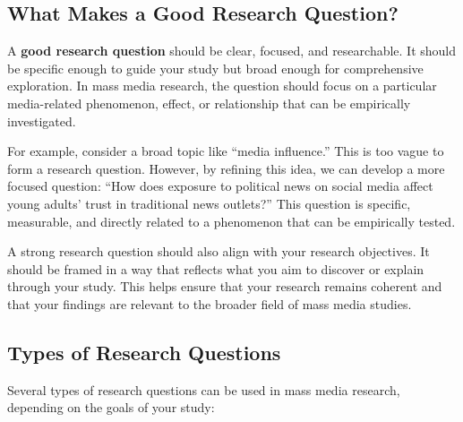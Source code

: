 \documentclass[
]{book}
\begin{document}
\subsection*{What Makes a Good Research Question?}\label{what-makes-a-good-research-question}

A \textbf{good research question} should be clear, focused, and researchable. It should be specific enough to guide your study but broad enough for comprehensive exploration. In mass media research, the question should focus on a particular media-related phenomenon, effect, or relationship that can be empirically investigated.

For example, consider a broad topic like ``media influence.'' This is too vague to form a research question. However, by refining this idea, we can develop a more focused question: ``How does exposure to political news on social media affect young adults' trust in traditional news outlets?'' This question is specific, measurable, and directly related to a phenomenon that can be empirically tested.

A strong research question should also align with your research objectives. It should be framed in a way that reflects what you aim to discover or explain through your study. This helps ensure that your research remains coherent and that your findings are relevant to the broader field of mass media studies.

\subsection*{Types of Research Questions}\label{types-of-research-questions}

Several types of research questions can be used in mass media research, depending on the goals of your study:
\end{document}
